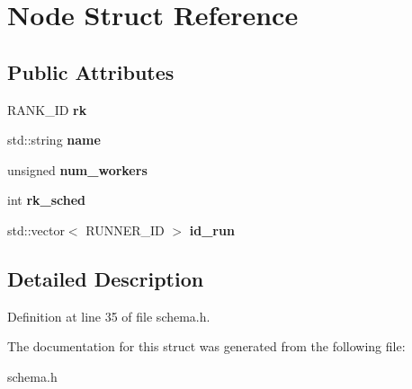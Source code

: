 \section{Node Struct Reference}
\label{struct_node}
\subsection*{Public Attributes}
\begin{CompactItemize}
\item 
RANK\_\-ID {\bf rk}\label{struct_node_7de6f254b6b8c3f9f8287af0bb742e9b}

\item 
std::string {\bf name}\label{struct_node_3c4318d71ca9a44fe33edcf8b7f26863}

\item 
unsigned {\bf num\_\-workers}\label{struct_node_01fec86d75332858b158c810d57caee3}

\item 
int {\bf rk\_\-sched}\label{struct_node_98deed2036c3dd8fc0f4fe8dacf56a92}

\item 
std::vector$<$ RUNNER\_\-ID $>$ {\bf id\_\-run}\label{struct_node_a90013b890888d3d252a71cb4fe48934}

\end{CompactItemize}


\subsection{Detailed Description}




Definition at line 35 of file schema.h.

The documentation for this struct was generated from the following file:\begin{CompactItemize}
\item 
schema.h\end{CompactItemize}
